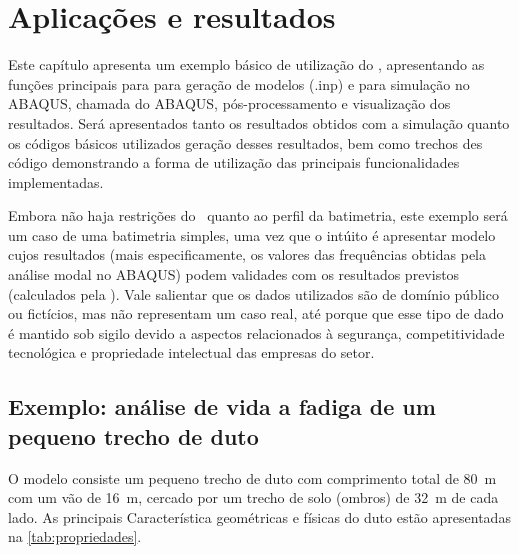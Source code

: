 \chapter{Aplicações e resultados\label{chap:aplicacoes}}

Este capítulo apresenta um exemplo básico de utilização do \frame, apresentando as funções principais para para geração de modelos (.inp) e para simulação no ABAQUS, chamada do ABAQUS, pós-processamento e visualização dos resultados. Será apresentados tanto os resultados obtidos com a simulação quanto os códigos básicos utilizados geração desses resultados, bem como trechos des código demonstrando a forma de utilização das principais funcionalidades implementadas.

Embora não haja restrições do \frame\ quanto ao perfil da batimetria, este exemplo será um caso de uma batimetria simples, uma vez que o intúito é apresentar modelo cujos resultados (mais especificamente, os valores das frequências obtidas pela análise modal no ABAQUS) podem validades com os resultados previstos (calculados pela \fatfree).
Vale salientar que os dados utilizados são de domínio público ou fictícios, mas não representam um caso real, até porque que esse tipo de dado é mantido sob sigilo devido a aspectos relacionados à segurança, competitividade tecnológica e propriedade intelectual das empresas do setor.


\section{Exemplo: análise de vida a fadiga de um pequeno trecho de duto\label{sec:model-exemplo}}


O modelo consiste um pequeno trecho de duto com comprimento total de 80~m com um vão de 16~m, cercado por um trecho de solo (ombros) de 32~m de cada lado. As principais Característica geométricas e físicas do duto estão apresentadas na \autoref{tab:propriedades}.

